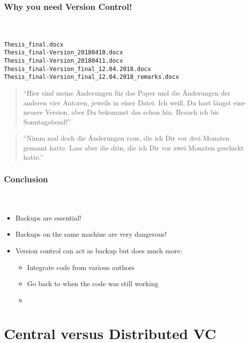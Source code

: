 \documentclass[12pt,ngerman]{beamer}
\begin{document}
\begin{frame}
\frametitle{Why you need Version Control!}
\framesubtitle{~}

\vspace*{2em}
\begin{verbatim}
Thesis_final.docx
Thesis_final-Version_20180410.docx
Thesis_final-Version_20180411.docx
Thesis_final-Version_final_12.04.2018.docx
Thesis_final-Version_final_12.04.2018_remarks.docx
\end{verbatim}

\vspace*{3em}

\begin{quote}
\enquote{Hier sind meine Änderungen für das Paper und die Änderungen der anderen vier Autoren, jeweils in einer Datei. Ich weiß, Du hast längst eine neuere Version, aber Du bekommst das schon hin. Brauch ich bis Sonntagabend!}

\end{quote}

\vspace*{3em}

\begin{quote}
\enquote{Nimm mal doch die Änderungen raus, die ich Dir vor drei Monaten genannt hatte. Lass aber die drin, die ich Dir vor zwei Monaten geschickt hatte.}
\end{quote}

\end{frame}

\begin{frame}
\frametitle{Conclusion}
\framesubtitle{~}

\begin{itemize}
\item Backups are essential!
\item Backups on the same machine are very dangerous!
\item Version control can act as backup but does much more:

\begin{itemize}
	\item Integrate code from various authors
	\item Go back to when the code was still working
	\item 
\end{itemize}

\end{itemize}
\end{frame}


\section{Central versus Distributed VC}
\end{document}
